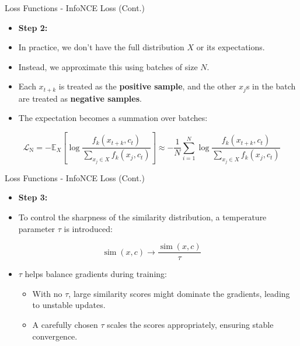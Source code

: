 \documentclass[serif, aspectratio=169]{beamer}
\begin{document}
\begin{frame}{Loss Functions - InfoNCE Loss (Cont.)}
    \begin{itemize}
        \item \textbf{Step 2:}
        \item In practice, we don’t have the full distribution $X$ or its expectations.
        \item Instead, we approximate this using batches of size $N$.
        \item Each $x_{t+k}$ is treated as the \textbf{positive sample}, and the other $x_j$s in the batch are treated as \textbf{negative samples}.
        \item The expectation becomes a summation over batches:
    \end{itemize}

    \begin{equation}
        \mathcal{L}_{\mathrm{N}} =
        -{\mathbb{E}_X}\left[\log \frac{f_k\left(x_{t+k}, c_t\right)}{\sum_{x_j \in X} f_k\left(x_j, c_t\right)}\right] \approx
        -\frac{1}{N} \sum_{i=1}^N\log \frac{f_k\left(x_{t+k}, c_t\right)}{\sum_{x_j \in X} f_k\left(x_j, c_t\right)}
    \end{equation}
\end{frame}


\begin{frame}{Loss Functions - InfoNCE Loss (Cont.)}
    \begin{itemize}
        \item \textbf{Step 3:}
        \item To control the sharpness of the similarity distribution, a temperature parameter $\tau$ is introduced:
    \end{itemize}

    \begin{equation}
        \operatorname{sim}\left(x, c \right) \xrightarrow{}
        \frac{\operatorname{sim}\left(x, c \right)}{\tau}
    \end{equation}

    \begin{itemize}
        \item $\tau$ helps balance gradients during training:

        \begin{itemize}
            \item With no $\tau$, large similarity scores might dominate the gradients, leading to unstable updates.
            \item A carefully chosen $\tau$ scales the scores appropriately, ensuring stable convergence.
        \end{itemize}
    \end{itemize}
\end{frame}
\end{document}
